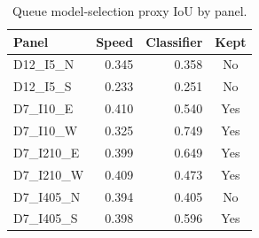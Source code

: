 \begin{table}[t]\centering\caption{Queue model-selection proxy IoU by panel.}\label{tab:queue-selection}
\begin{tabular}{lrrc}\hline Panel & Speed & Classifier & Kept \\ \hline
D12\_I5\_N & 0.345 & 0.358 & No \\
D12\_I5\_S & 0.233 & 0.251 & No \\
D7\_I10\_E & 0.410 & 0.540 & Yes \\
D7\_I10\_W & 0.325 & 0.749 & Yes \\
D7\_I210\_E & 0.399 & 0.649 & Yes \\
D7\_I210\_W & 0.409 & 0.473 & Yes \\
D7\_I405\_N & 0.394 & 0.405 & No \\
D7\_I405\_S & 0.398 & 0.596 & Yes \\
\hline\end{tabular}\end{table}